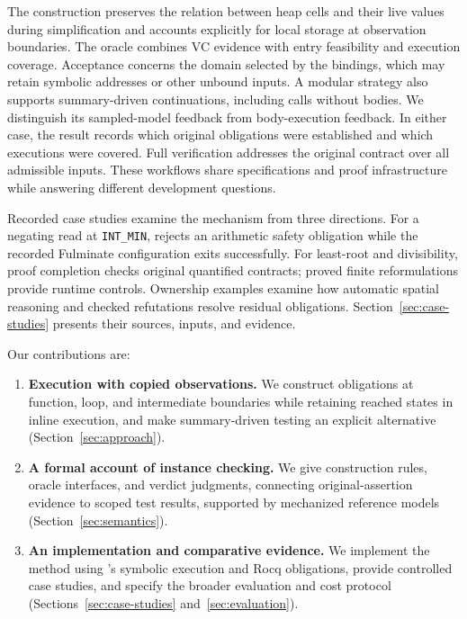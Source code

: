 The construction preserves the relation between heap cells and their live
values during simplification and accounts explicitly for local storage
at observation boundaries. The oracle combines VC evidence with entry
feasibility and execution coverage. Acceptance concerns the domain selected
by the bindings, which may retain symbolic addresses or other unbound
inputs. A modular strategy also supports summary-driven continuations, including
calls without bodies. We distinguish its sampled-model feedback from
body-execution feedback. In either case, the result records which original
obligations were established and which executions were covered.
Full \qcp{} verification addresses the original contract over all
admissible inputs. These workflows share specifications and proof
infrastructure while answering different development questions.

Recorded case studies examine the mechanism from three directions.
For a negating read at \texttt{INT\_MIN}, \tespec{} rejects an arithmetic
safety obligation while the recorded Fulminate configuration exits
successfully. For least-root and divisibility, proof completion checks
original quantified contracts; proved finite reformulations provide
runtime controls. Ownership examples examine how automatic spatial
reasoning and checked refutations resolve residual obligations.
Section~\ref{sec:case-studies} presents their sources, inputs, and evidence.

Our contributions are:
\begin{enumerate}
\item \textbf{Execution with copied observations.}
We construct obligations at function, loop, and intermediate boundaries
while retaining reached states in inline execution, and make summary-driven
testing an explicit alternative
(Section~\ref{sec:approach}).
\item \textbf{A formal account of instance checking.}
We give construction rules, oracle interfaces, and verdict judgments,
connecting original-assertion evidence to scoped test results, supported
by mechanized reference models (Section~\ref{sec:semantics}).
\item \textbf{An implementation and comparative evidence.}
We implement the method using \qcp{}'s symbolic execution and Rocq
obligations, provide controlled case studies, and specify the broader
evaluation and cost protocol
(Sections~\ref{sec:case-studies} and~\ref{sec:evaluation}).
\end{enumerate}
